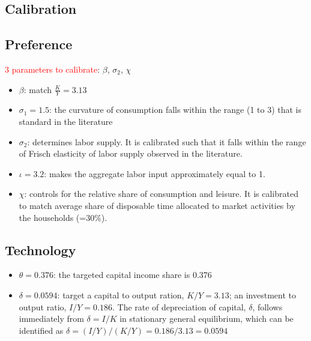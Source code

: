 \documentclass{article}
\begin{document}
\begin{spacing}{1.5}
\section{Calibration}
\noindent
\subsection*{Preference}
\textcolor{red}{3 parameters to calibrate}: $\beta$, $\sigma_2$, $\chi$
\begin{itemize}
\item $\beta$: match $\frac{K}{Y}=3.13$
\item $\sigma_1=1.5$: the curvature of consumption falls within the range (1 to 3) that is standard in the literature
\item $\sigma_2$: determines labor supply. It is calibrated such that it falls within the range of Frisch elasticity of labor supply observed in the literature.
\item $\iota=3.2$: makes the aggregate labor input approximately equal to 1.
\item $\chi$: controls for the relative share of consumption and leisure. It is calibrated to match average share of disposable time allocated to market activities by the households (=$30\%$).
\end{itemize}

\subsection*{Technology}
\begin{itemize}
\item $\theta=0.376$: the targeted capital income share is 0.376
\item $\delta=0.0594$: target a capital to output ration, $K/Y=3.13$; an investment to output ratio, $I/Y=0.186$. The rate of depreciation of capital, $\delta$, follows immediately from $\delta=I/K$ in stationary general equilibrium, which can be identified as $\delta=(I/Y)/(K/Y)=0.186/3.13=0.0594$
\end{itemize}


\end{spacing}
\end{document}
